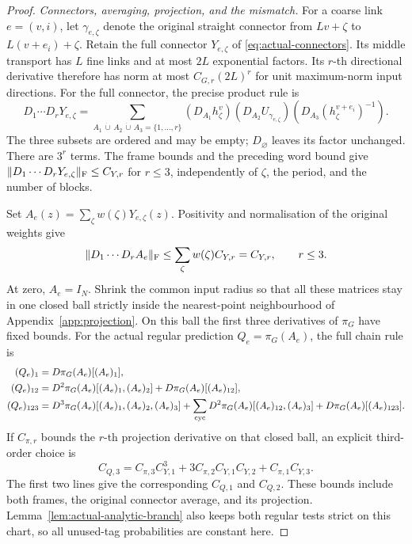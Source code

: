 \documentclass[11pt,reqno]{amsart}
\numberwithin{equation}{section}
\theoremstyle{definition}
\theoremstyle{remark}
\begin{document}
\begin{proof}
\smallskip\noindent
\emph{Connectors, averaging, projection, and the mismatch.}
For a coarse link \(e=(v,i)\), let \(\gamma_{e,\zeta}\)
denote the original straight connector from \(Lv+\zeta\)
to \(L(v+e_i)+\zeta\). Retain the full connector
\(Y_{e,\zeta}\) of \eqref{eq:actual-connectors}. Its middle
transport has \(L\) fine links and at most \(2L\)
exponential factors. Its \(r\)-th directional derivative
therefore has norm at most \(C_{G,r}(2L)^r\) for unit
maximum-norm input directions. For the full connector,
the precise product rule is
\[
 D_1\cdots D_rY_{e,\zeta}
   =\sum_{A_1\,\dot\cup\,A_2\,\dot\cup\,A_3=\{1,\ldots,r\}}
       (D_{A_1}h_\zeta^v)
       (D_{A_2}U_{\gamma_{e,\zeta}})
       (D_{A_3}(h_\zeta^{v+e_i})^{-1}).
\]
The three subsets are ordered and may be empty;
\(D_\varnothing\) leaves its factor unchanged. There are
\(3^r\) terms. The frame bounds and the preceding word
bound give \(\|D_1\cdots D_rY_{e,\zeta}\|_{\rm F}\le C_{Y,r}\)
for \(r\le3\), independently of \(\zeta\), the period,
and the number of blocks.

Set \(A_e(z)=\sum_\zeta w(\zeta)Y_{e,\zeta}(z)\).
Positivity and normalisation of the original weights give
\begin{equation}
 \|D_1\cdots D_rA_e\|_{\rm F}
       \le\sum_\zeta w(\zeta)C_{Y,r}=C_{Y,r},\qquad r\le3.
 \label{eq:action-connector-average-price}
\end{equation}
At zero, \(A_e=I_N\). Shrink the common input radius so
that all these matrices stay in one closed ball strictly
inside the nearest-point neighbourhood of
Appendix~\ref{app:projection}. On this ball the first three
derivatives of \(\pi_G\) have fixed bounds. For the actual
regular prediction \(Q_e=\pi_G(A_e)\), the full chain rule is
\begin{align}
 (Q_e)_1={}&D\pi_G(A_e)[(A_e)_1],\notag\\
 (Q_e)_{12}={}&D^2\pi_G(A_e)[(A_e)_1,(A_e)_2]
                          +D\pi_G(A_e)[(A_e)_{12}],\notag\\
 (Q_e)_{123}={}&D^3\pi_G(A_e)[(A_e)_1,(A_e)_2,(A_e)_3]
        +\sum_{\rm cyc}D^2\pi_G(A_e)[(A_e)_{12},(A_e)_3]
                          +D\pi_G(A_e)[(A_e)_{123}].
 \label{eq:action-predictor-chain-rule}
\end{align}
If \(C_{\pi,r}\) bounds the \(r\)-th projection derivative
on that closed ball, an explicit third-order choice is
\[
 C_{Q,3}=C_{\pi,3}C_{Y,1}^3
           +3C_{\pi,2}C_{Y,1}C_{Y,2}+C_{\pi,1}C_{Y,3}.
\]
The first two lines give the corresponding \(C_{Q,1}\)
and \(C_{Q,2}\). These bounds include
both frames, the original connector average, and its
projection. Lemma~\ref{lem:actual-analytic-branch} also
keeps both regular tests strict on this chart, so all
unused-tag probabilities are constant here.


\end{proof}
\end{document}

